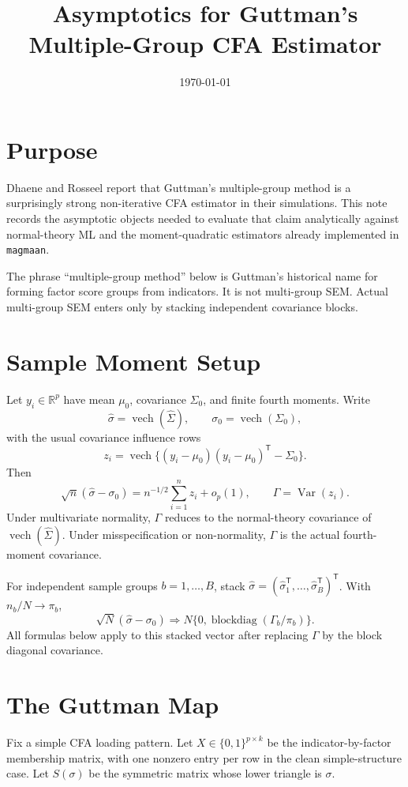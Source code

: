 \documentclass[11pt]{article}
\title{Asymptotics for Guttman's Multiple-Group CFA Estimator}
\author{}
\date{\today}
\newcommand{\T}{^{\mathsf T}}
\newcommand{\Var}{\operatorname{Var}}
\newcommand{\vech}{\operatorname{vech}}
\theoremstyle{plain}
\theoremstyle{remark}
\begin{document}
\maketitle

\section*{Purpose}

Dhaene and Rosseel \cite{dhaene2024} report that Guttman's multiple-group
method \cite{guttman1952} is a surprisingly strong non-iterative CFA estimator
in their simulations. This note records the asymptotic objects needed to
evaluate that claim analytically against normal-theory ML and the
moment-quadratic estimators already implemented in \texttt{magmaan}.

The phrase ``multiple-group method'' below is Guttman's historical name for
forming factor score groups from indicators. It is not multi-group SEM. Actual
multi-group SEM enters only by stacking independent covariance blocks.

\section{Sample Moment Setup}

Let \(y_i\in\mathbb{R}^p\) have mean \(\mu_0\), covariance \(\Sigma_0\), and
finite fourth moments. Write
\[
  \hat\sigma=\vech(\hat\Sigma),\qquad
  \sigma_0=\vech(\Sigma_0),
\]
with the usual covariance influence rows
\[
  z_i=\vech\{(y_i-\mu_0)(y_i-\mu_0)\T-\Sigma_0\}.
\]
Then
\[
  \sqrt n(\hat\sigma-\sigma_0)
    = n^{-1/2}\sum_{i=1}^n z_i+o_p(1),
  \qquad
  \Gamma=\Var(z_i).
\]
Under multivariate normality, \(\Gamma\) reduces to the normal-theory
covariance of \(\vech(\hat\Sigma)\). Under misspecification or non-normality,
\(\Gamma\) is the actual fourth-moment covariance.

For independent sample groups \(b=1,\ldots,B\), stack
\(\hat\sigma=(\hat\sigma_1\T,\ldots,\hat\sigma_B\T)\T\). With
\(n_b/N\to\pi_b\),
\[
  \sqrt N(\hat\sigma-\sigma_0)
    \Rightarrow
  N\{0,\operatorname{blockdiag}(\Gamma_b/\pi_b)\}.
\]
All formulas below apply to this stacked vector after replacing \(\Gamma\) by
the block diagonal covariance.

\section{The Guttman Map}

Fix a simple CFA loading pattern. Let \(X\in\{0,1\}^{p\times k}\) be the
indicator-by-factor membership matrix, with one nonzero entry per row in the
clean simple-structure case. Let \(S(\sigma)\) be the symmetric matrix whose
lower triangle is \(\sigma\).
\end{document}
